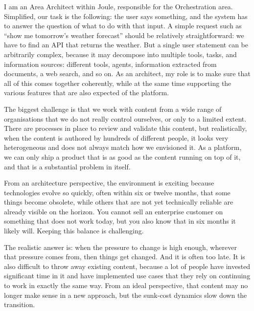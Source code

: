 I am an Area Architect within Joule, responsible for the Orchestration area. Simplified, our task is the following: the user says something, and the system has to answer the question of what to do with that input. A simple request such as ``show me tomorrow's weather forecast'' should be relatively straightforward: we have to find an API that returns the weather. But a single user statement can be arbitrarily complex, because it may decompose into multiple tools, tasks, and information sources: different tools, agents, information extracted from documents, a web search, and so on. As an architect, my role is to make sure that all of this comes together coherently, while at the same time supporting the various features that are also expected of the platform.

\medskip{}

The biggest challenge is that we work with content from a wide range of organisations that we do not really control ourselves, or only to a limited extent. There are processes in place to review and validate this content, but realistically, when the content is authored by hundreds of different people, it looks very heterogeneous and does not always match how we envisioned it. As a platform, we can only ship a product that is as good as the content running on top of it, and that is a substantial problem in itself.

From an architecture perspective, the environment is exciting because technologies evolve so quickly, often within six or twelve months, that some things become obsolete, while others that are not yet technically reliable are already visible on the horizon. You cannot sell an enterprise customer on something that does not work today, but you also know that in six months it likely will. Keeping this balance is challenging.

\medskip{}

The realistic answer is: when the pressure to change is high enough, wherever that pressure comes from, then things get changed. And it is often too late. It is also difficult to throw away existing content, because a lot of people have invested significant time in it and have implemented use cases that they rely on continuing to work in exactly the same way. From an ideal perspective, that content may no longer make sense in a new approach, but the sunk-cost dynamics slow down the transition.

